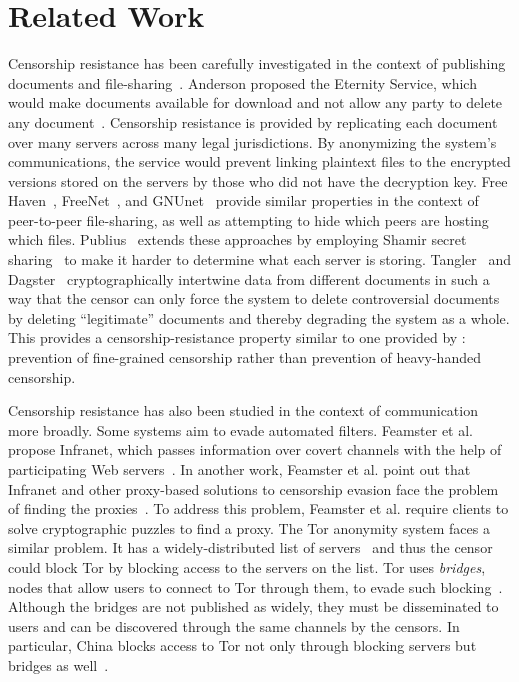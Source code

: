 \section{Related Work}
\label{sec:related}

Censorship resistance has been carefully investigated in the context of
publishing documents and
file-sharing~\cite{eternity,freehaven,freenet,gnunet-esed,publius,tangler,dagster}.
Anderson proposed the Eternity Service, which would make documents
available for download and not allow any party to delete any
document~\cite{eternity}. Censorship resistance is provided by
replicating each document over many servers across many legal
jurisdictions. By anonymizing the system's communications, the service
would prevent linking plaintext files to the encrypted versions stored
on the servers by those who did not have the decryption key. Free
Haven~\cite{freehaven}, FreeNet~\cite{freenet}, and
GNUnet~\cite{gnunet-esed} provide similar properties in the context of
peer-to-peer file-sharing, as well as attempting to hide which peers are
hosting which files. Publius~\cite{publius} extends these approaches by
employing Shamir secret sharing~\cite{shamir} to make it harder to
determine what each server is storing. Tangler~\cite{tangler} and
Dagster~\cite{dagster} cryptographically intertwine data from different
documents in such a way that the censor can only force the system to
delete controversial documents by deleting ``legitimate'' documents and
thereby degrading the system as a whole. This provides a
censorship-resistance property similar to one provided by \hoot:
prevention of fine-grained censorship rather than prevention of
heavy-handed censorship.

Censorship resistance has also been studied in the context of
communication more broadly. Some systems aim to evade automated
filters. Feamster et al. propose Infranet, which passes information over
covert channels with the help of participating Web
servers~\cite{infranet}. In another work, Feamster et al. point out that
Infranet and other proxy-based solutions to censorship evasion face the
problem of finding the proxies~\cite{feamster03proxy}. To address this
problem, Feamster et al. require clients to solve cryptographic puzzles
to find a proxy. The Tor anonymity system faces a similar problem. It
has a widely-distributed list of servers~\cite{tor} and thus the censor
could block Tor by blocking access to the servers on the list. Tor uses
{\em bridges}, nodes that allow users to connect to Tor through them, to
evade such blocking~\cite{tor-bridges}. Although the bridges are not
published as widely, they must be disseminated to users and can be
discovered through the same channels by the censors. In particular,
China blocks access to Tor not only through blocking servers but bridges
as well~\cite{tor-china}.

